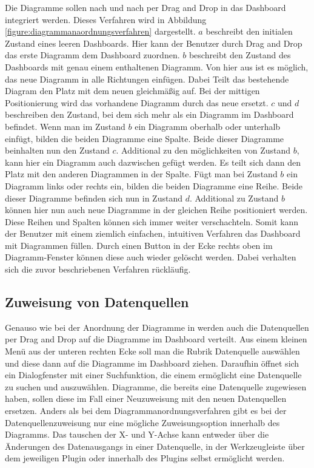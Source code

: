 Die Diagramme sollen nach und nach per Drag and Drop in das Dashboard integriert werden. Dieses Verfahren
wird in Abbildung \ref{figure:diagrammanaordnungsverfahren} dargestellt. \(a\) beschreibt den
initialen Zustand eines leeren Dashboards. Hier kann der Benutzer durch Drag and Drop das erste Diagramm dem Dashboard
zuordnen. \(b\) beschreibt den Zustand des Dashboards mit genau einem enthaltenen Diagramm. Von hier aus ist es möglich, das
neue Diagramm in alle Richtungen einfügen. Dabei Teilt das bestehende Diagram den Platz mit dem neuen gleichmäßig
auf. Bei der mittigen Positionierung wird das vorhandene Diagramm durch das neue ersetzt. \(c\) und \(d\)
beschreiben den Zustand, bei dem sich mehr als ein Diagramm im Dashboard befindet. Wenn man im Zustand \(b\)
ein Diagramm oberhalb oder unterhalb einfügt, bilden die beiden Diagramme eine Spalte. Beide dieser Diagramme
beinhalten nun den Zustand \(c\). Additional zu den möglichkeiten von Zustand \(b\), kann hier ein Diagramm
auch dazwischen gefügt werden. Es teilt sich dann den Platz mit den anderen Diagrammen in der Spalte.
Fügt man bei Zustand \(b\) ein Diagramm links oder rechts ein, bilden die beiden Diagramme eine Reihe.
Beide dieser Diagramme befinden sich nun in Zustand \(d\). Additional zu Zustand \(b\) können hier nun
auch neue Diagramme in der gleichen Reihe positioniert werden. Diese Reihen und Spalten können sich
immer weiter verschachteln. Somit kann der Benutzer mit einem ziemlich einfachen, intuitiven Verfahren
das Dashboard mit Diagrammen füllen. Durch einen Button in der Ecke rechts oben im Diagramm-Fenster
können diese auch wieder gelöscht werden. Dabei verhalten sich die zuvor beschriebenen Verfahren rückläufig.

\subsection{Zuweisung von Datenquellen}
\label{subsec:zuweisungungvondatenquellen}
Genauso wie bei der Anordnung der Diagramme in  werden
auch die Datenquellen per Drag and Drop auf die Diagramme im Dashboard verteilt. Aus einem kleinen
Menü aus der unteren rechten Ecke soll man die Rubrik Datenquelle auswählen und diese dann auf
die Diagramme im Dashboard ziehen. Daraufhin öffnet sich ein Dialogfenster mit einer Suchfunktion,
die einem ermöglicht eine Datenquelle zu suchen und auszuwählen. Diagramme, die bereits eine
Datenquelle zugewiesen haben, sollen diese im Fall einer Neuzuweisung mit den neuen Datenquellen
ersetzen. Anders als bei dem Diagrammanordnungsverfahren gibt es bei der Datenquellenzuweisung
nur eine mögliche Zuweisungsoption innerhalb des Diagramms. Das tauschen der X- und Y-Achse kann
entweder über die Änderungen des Datenausgangs in einer Datenquelle, in der Werkzeugleiste über
dem jeweiligen Plugin oder innerhalb des Plugins selbst ermöglicht werden.

